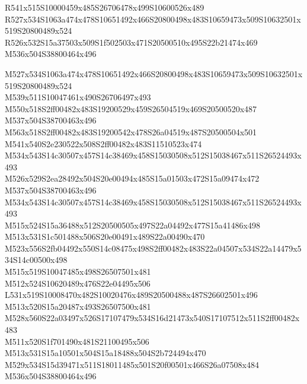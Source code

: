 \documentclass{article}
\begin{document}
\begin{multicols}{5}
\begin{center}
R541x515S10000459x485S26706478x499S10600526x489 %
\\R527x534S1063a474x478S10651492x466S20800498x483S10659473x509S10632501x519S20800489x524 %
\\R526x532S15a37503x509S1f502503x471S20500510x495S22b21474x469 %
\\M536x504S38800464x496 %

M527x534S1063a474x478S10651492x466S20800498x483S10659473x509S10632501x519S20800489x524 %
\\M539x511S10047461x490S26706497x493 %
\\M550x518S2ff00482x483S19200529x459S26504519x469S20500520x487 %
\\M537x504S38700463x496 %
\\M563x518S2ff00482x483S19200542x478S26a04519x487S20500504x501 %
\\M541x540S2e230522x508S2ff00482x483S11510523x474 %
\\M534x543S14c30507x457S14c38469x458S15030508x512S15038467x511S26524493x493 %
\\M526x529S2ea28492x504S20e00494x485S15a01503x472S15a09474x472 %
\\M537x504S38700463x496 %
\\M534x543S14c30507x457S14c38469x458S15030508x512S15038467x511S26524493x493 %
\\M515x524S15a36488x512S20500505x497S22a04492x477S15a41486x498 %
\\M513x531S1c501488x506S20e00491x489S22a00490x470 %
\\M523x556S2fb04492x550S14c08475x498S2ff00482x483S22a04507x534S22a14479x534S14c00500x498 %
\\M515x519S10047485x498S26507501x481 %
\\M512x524S10620489x476S22e04495x506 %
\\L531x519S10008470x482S10020476x489S20500488x487S26602501x496 %
\\M513x520S15a20487x493S26507500x481 %
\\M528x560S22a03497x526S17107479x534S16d21473x540S17107512x511S2ff00482x483 %
\\M511x520S1f701490x481S21100495x506 %
\\M513x531S15a10501x504S15a18488x504S2b724494x470 %
\\M529x534S15d39471x511S18011485x501S20f00501x466S26a07508x484 %
\\M536x504S38800464x496 %

\end{center}
\end{multicols}
\end{document}
